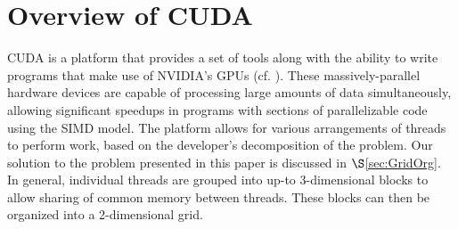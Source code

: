 \documentclass[12pt]{ucthesis}
\begin{document}
%
%
%
%
%

\section{Overview of CUDA}
\label{sec:cuda}
CUDA is a platform that provides a set of tools along with the ability to 
write programs that make use of NVIDIA's GPUs (cf. 
\cite{nvidia2012programming}). These massively-parallel hardware devices are 
capable of processing large amounts of data simultaneously, allowing 
significant speedups in programs with sections of parallelizable code using 
the SIMD model. The platform allows for various arrangements of threads to 
perform work, based on the developer's decomposition of the problem. Our 
solution to the problem presented in this paper is discussed in 
$\S$\ref{sec:GridOrg}. In general, individual threads are grouped into up-to 
3-dimensional blocks to allow sharing of common memory between threads. These 
blocks can then be organized into a 2-dimensional grid. 
\end{document}
